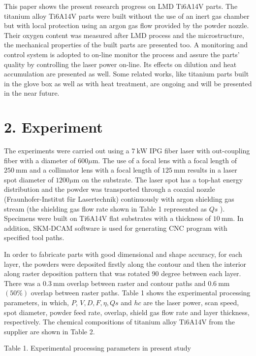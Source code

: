 \documentclass[10pt]{article}
\begin{document}
This paper shows the present research progress on LMD Ti6A14V parts. The titanium alloy Ti6A14V parts were built without the use of an inert gas chamber but with local protection using an argon gas flow provided by the powder nozzle. Their oxygen content was measured after LMD process and the microstructure, the mechanical properties of the built parts are presented too. A monitoring and control system is adopted to on-line monitor the process and assure the parts' quality by controlling the laser power on-line. Its effects on dilution and heat accumulation are presented as well. Some related works, like titanium parts built in the glove box as well as with heat treatment, are ongoing and will be presented in the near future.

\section*{2. Experiment}
The experiments were carried out using a $7 \mathrm{~kW}$ IPG fiber laser with out-coupling fiber with a diameter of $600 \mu \mathrm{m}$. The use of a focal lens with a focal length of $250 \mathrm{~mm}$ and a collimator lens with a focal length of $125 \mathrm{~mm}$ results in a laser spot diameter of $1200 \mu \mathrm{m}$ on the substrate. The laser spot has a top-hat energy distribution and the powder was transported through a coaxial nozzle (Fraunhofer-Institut für Lasertechnik) continuously with argon shielding gas stream (the shielding gas flow rate shown in Table 1 represented as $Q s$ ). Specimens were built on Ti6A14V flat substrates with a thickness of $10 \mathrm{~mm}$. In addition, SKM-DCAM software is used for generating CNC program with specified tool paths.

In order to fabricate parts with good dimensional and shape accuracy, for each layer, the powders were deposited firstly along the contour and then the interior along raster deposition pattern that was rotated 90 degree between each layer. There was a $0.3 \mathrm{~mm}$ overlap between raster and contour paths and $0.6 \mathrm{~mm}$ $(50 \%)$ overlap between raster paths. Table 1 shows the experimental processing parameters, in which, $P$, $V, D, F, \eta, Q s$ and $h c$ are the laser power, scan speed, spot diameter, powder feed rate, overlap, shield gas flow rate and layer thickness, respectively. The chemical compositions of titanium alloy Ti6A14V from the supplier are shown in Table 2.

Table 1. Experimental processing parameters in present study
\end{document}
